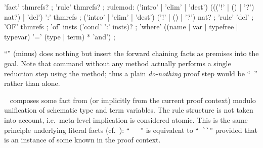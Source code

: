 \begin{isabellebody}
\begin{isamarkuptext}
  \begin{rail}
    'fact' thmrefs?
    ;
    'rule' thmrefs?
    ;
    rulemod: ('intro' | 'elim' | 'dest') ((('!' | () | '?') nat?) | 'del') ':' thmrefs
    ;
    ('intro' | 'elim' | 'dest') ('!' | () | '?') nat?
    ;
    'rule' 'del'
    ;
    'OF' thmrefs
    ;
    'of' insts ('concl' ':' insts)?
    ;
    'where' ((name | var | typefree | typevar) '=' (type | term) * 'and')
    ;
  \end{rail}

  \begin{description}
  
  \item ``\hyperlink{method.-}{\mbox{\isa{{\isacharminus}}}}'' (minus) does nothing but insert the forward
  chaining facts as premises into the goal.  Note that command
  \hyperlink{command.proof}{\mbox{}} without any method actually performs a single
  reduction step using the \hyperlink{method.rule}{\mbox{}} method; thus a plain
  \emph{do-nothing} proof step would be ``\hyperlink{command.proof}{\mbox{}}~\isa{{\isachardoublequote}{\isacharminus}{\isachardoublequote}}'' rather than \hyperlink{command.proof}{\mbox{}} alone.
  
  \item \hyperlink{method.fact}{\mbox{}}~ composes some fact from
   (or implicitly from the current proof context)
  modulo unification of schematic type and term variables.  The rule
  structure is not taken into account, i.e.\ meta-level implication is
  considered atomic.  This is the same principle underlying literal
  facts (cf.\ ): ``\hyperlink{command.have}{\mbox{}}~\isa{{\isachardoublequote}{\isasymphi}{\isachardoublequote}}~\hyperlink{command.by}{\mbox{}}~'' is equivalent to ``\hyperlink{command.note}{\mbox{}}~\verb|`|\isa{{\isasymphi}}\verb|`|'' provided that
  \isa{{\isachardoublequote}{\isasymturnstile}\ {\isasymphi}{\isachardoublequote}} is an instance of some known \isa{{\isachardoublequote}{\isasymturnstile}\ {\isasymphi}{\isachardoublequote}} in the
  proof context.
  

\end{description}
\end{isamarkuptext}
\end{isabellebody}
